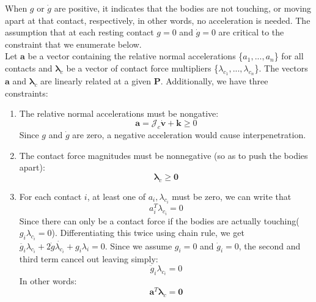         When $g$ or $\dot{g}$ are positive, it indicates that the bodies are not touching, or moving apart at that contact, respectively, in other words, no acceleration is needed. The assumption that at each resting contact $g = 0$ and $\dot{g} = 0 $ are critical to the constraint that we enumerate below.\\

        Let $\pmb{a}$ be a vector containing the relative normal accelerations \{$a_1,...,a_n$\} for all contacts and $\pmb{\lambda}_c$ be a vector of contact force multipliers \{$\lambda_{c_1},..., \lambda_{c_n}$\}. The vectors $\pmb{a}$ and $\pmb{\lambda}_c$ are linearly related at a given $\mathbf{P}$. Additionally, we have three constraints:
        \begin{enumerate}
            \item The relative normal accelerations must be nongative:
            \begin{equation}
                \pmb{a} = \mathcal{J}_c\dot{\mathbf{v}}+\pmb{k} \ge 0
            \end{equation}
            Since $g$ and $\dot{g}$ are zero, a negative acceleration would cause interpenetration.
            \item The contact force magnitudes must be nonnegative (so as to push the bodies apart): 
            \begin{equation}
                \pmb{\lambda}_c \ge \pmb{0}
            \end{equation}
            \item For each contact $i$, at least one of $a_i, \lambda_{c_i}$ must be zero, we can write that
            \begin{equation}
                a_{i}^{T}\lambda_{c_{i}} = 0
            \end{equation}
            Since there can only be a contact force if the bodies are actually touching($g_i\lambda_{c_i} = 0$). Differentiating this twice using chain rule, we get $\ddot{g_i}\lambda_{c_i} + 2\dot{g}\dot{\lambda_{c_i}} + g_i\lambda_{i} = 0$. Since we assume $g_i = 0$ and $\dot{g}_i = 0$, the second and third term cancel out leaving simply:
            \begin{equation}
                \ddot{g}_i \lambda_{c_i}=0
            \end{equation}
            In other words:
            \begin{equation}
                \pmb{a}^{T}\pmb{\lambda}_{c} = \pmb{0}
            \end{equation}
        \end{enumerate}


